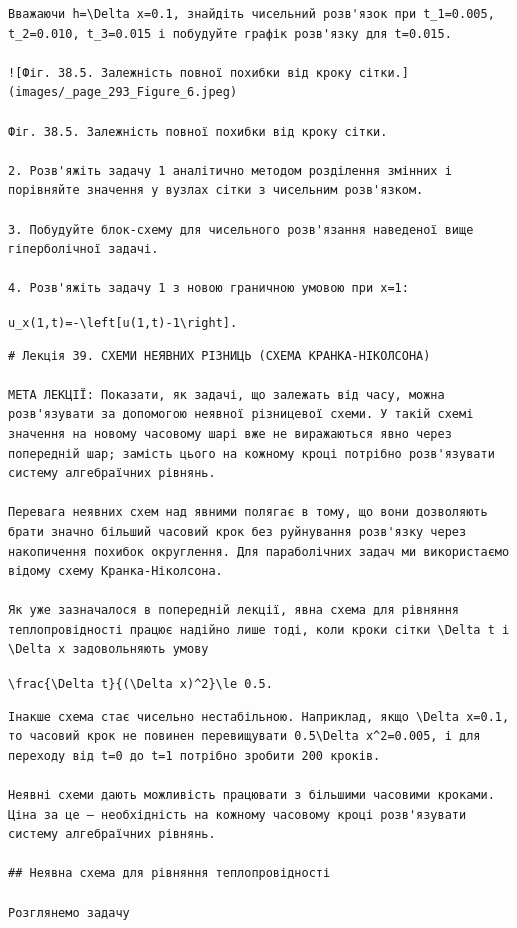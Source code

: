 \documentclass[
  ukrainian,
]{article}
\begin{document}
\begin{verbatim}
Вважаючи h=\Delta x=0.1, знайдіть чисельний розв'язок при t_1=0.005, t_2=0.010, t_3=0.015 і побудуйте графік розв'язку для t=0.015.

![Фіг. 38.5. Залежність повної похибки від кроку сітки.](images/_page_293_Figure_6.jpeg)

Фіг. 38.5. Залежність повної похибки від кроку сітки.

2. Розв'яжіть задачу 1 аналітично методом розділення змінних і порівняйте значення у вузлах сітки з чисельним розв'язком.

3. Побудуйте блок-схему для чисельного розв'язання наведеної вище гіперболічної задачі.

4. Розв'яжіть задачу 1 з новою граничною умовою при x=1:
\end{verbatim}

\texttt{u\_x(1,t)=-\textbackslash{}left{[}u(1,t)-1\textbackslash{}right{]}.}

\begin{verbatim}
# Лекція 39. СХЕМИ НЕЯВНИХ РІЗНИЦЬ (СХЕМА КРАНКА-НІКОЛСОНА)

МЕТА ЛЕКЦІЇ: Показати, як задачі, що залежать від часу, можна розв'язувати за допомогою неявної різницевої схеми. У такій схемі значення на новому часовому шарі вже не виражаються явно через попередній шар; замість цього на кожному кроці потрібно розв'язувати систему алгебраїчних рівнянь.

Перевага неявних схем над явними полягає в тому, що вони дозволяють брати значно більший часовий крок без руйнування розв'язку через накопичення похибок округлення. Для параболічних задач ми використаємо відому схему Кранка-Ніколсона.

Як уже зазначалося в попередній лекції, явна схема для рівняння теплопровідності працює надійно лише тоді, коли кроки сітки \Delta t і \Delta x задовольняють умову
\end{verbatim}

\texttt{\textbackslash{}frac\{\textbackslash{}Delta\ t\}\{(\textbackslash{}Delta\ x)\^{}2\}\textbackslash{}le\ 0.5.}

\begin{verbatim}
Інакше схема стає чисельно нестабільною. Наприклад, якщо \Delta x=0.1, то часовий крок не повинен перевищувати 0.5\Delta x^2=0.005, і для переходу від t=0 до t=1 потрібно зробити 200 кроків.

Неявні схеми дають можливість працювати з більшими часовими кроками. Ціна за це — необхідність на кожному часовому кроці розв'язувати систему алгебраїчних рівнянь.

## Неявна схема для рівняння теплопровідності

Розглянемо задачу
\end{verbatim}
\end{document}
